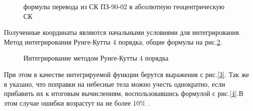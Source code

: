 \documentclass[]{article}
\begin{document}
	\begin{figure}[h!]
		
		\caption{формулы перевода из СК ПЗ-90-02 в абсолютную геоцентрическую СК }
		\label{1}
	\end{figure}
	
	Полученные координаты являются начальными условиями для интегрирования. Метод интегрирования Рунге-Кутты 4 порядка, общие формулы на рис.\ref{2}.
	
	\begin{figure}[h!]
		
		\caption{Интегрирование методом Рунге-Кутты 4 порядка }
		\label{2}
	\end{figure}
	
	
	При этом в качестве интегрируемой функции берутся выражения с рис.\ref{3}. Так же в \cite{ICD} указано, что поправки на небесные тела можно учесть однократно, если прибавить их к итоговым вычислениям, воспользовавшись формулой с рис.\ref{4}.В этом случае ошибки возрастут на не более 10\% .
	
\end{document}
